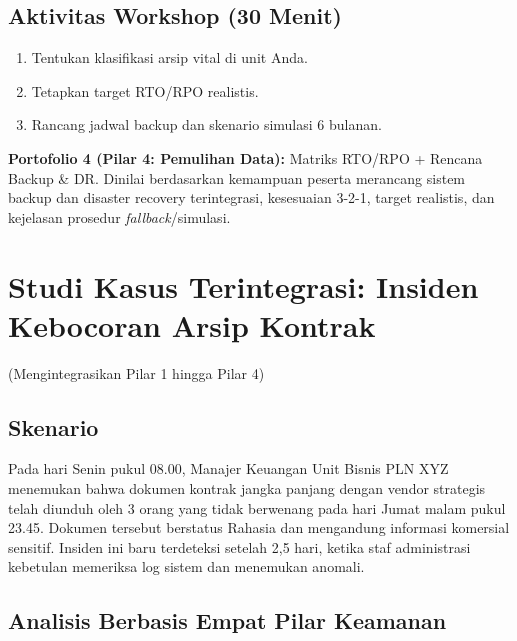 \documentclass[12pt,a4paper]{report}
\begin{document}
\section{Aktivitas Workshop (30 Menit)}
\begin{enumerate}[leftmargin=*]
    \item Tentukan klasifikasi arsip vital di unit Anda.
    \item Tetapkan target RTO/RPO realistis.
    \item Rancang jadwal backup dan skenario simulasi 6 bulanan.
\end{enumerate}

\begin{outputbox}
\textbf{Portofolio 4 (Pilar 4: Pemulihan Data):} Matriks RTO/RPO + Rencana Backup \& DR. Dinilai berdasarkan kemampuan peserta merancang sistem backup dan disaster recovery terintegrasi, kesesuaian 3-2-1, target realistis, dan kejelasan prosedur \textit{fallback}/simulasi.
\end{outputbox}

\chapter{Studi Kasus Terintegrasi: Insiden Kebocoran Arsip Kontrak}
(Mengintegrasikan Pilar 1 hingga Pilar 4)

\section{Skenario}
Pada hari Senin pukul 08.00, Manajer Keuangan Unit Bisnis PLN XYZ menemukan bahwa dokumen kontrak jangka panjang dengan vendor strategis telah diunduh oleh 3 orang yang tidak berwenang pada hari Jumat malam pukul 23.45. Dokumen tersebut berstatus Rahasia dan mengandung informasi komersial sensitif. Insiden ini baru terdeteksi setelah 2,5 hari, ketika staf administrasi kebetulan memeriksa log sistem dan menemukan anomali.

\section{Analisis Berbasis Empat Pilar Keamanan}
\end{document}
